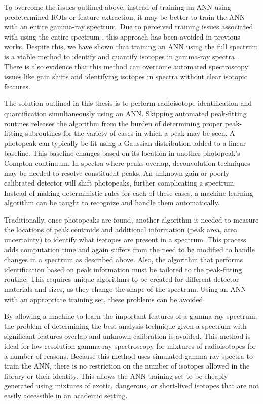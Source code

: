 To overcome the issues outlined above, instead of training an ANN using predetermined ROIs or feature extraction, it may be better to train the ANN with an entire gamma-ray spectrum. Due to perceived training issues associated with using the entire spectrum \cite{Pilato1999,Yoshida2002}, this approach has been avoided in previous works. Despite this, we have shown that training an ANN using the full spectrum is a viable method to identify and quantify isotopes in gamma-ray spectra \cite{kamuda2017,kamudaThesis2017}. There is also evidence that this method can overcome automated spectroscopy issues like gain shifts and identifying isotopes in spectra without clear isotopic features.

The solution outlined in this thesis is to perform radioisotope identification and quantification simultaneously using an ANN. Skipping automated peak-fitting routines releases the algorithm from the burden of determining proper peak-fitting subroutines for the variety of cases in which a peak may be seen. A photopeak can typically be fit using a Gaussian distribution added to a linear baseline. This baseline changes based on its location in another photopeak's Compton continuum. In spectra where peaks overlap, deconvolution techniques may be needed to resolve constituent peaks. An unknown gain or poorly calibrated detector will shift photopeaks, further complicating a spectrum. Instead of making deterministic rules for each of these cases, a machine learning algorithm can be taught to recognize and handle them automatically.

Traditionally, once photopeaks are found, another algorithm is needed to measure the locations of peak centroids and additional information (peak area, area uncertainty) to identify what isotopes are present in a spectrum. This process adds computation time and again suffers from the need to be modified to handle changes in a spectrum as described above. Also, the algorithm that performs identification based on peak information must be tailored to the peak-fitting routine. This requires unique algorithms to be created for different detector materials and sizes, as they change the shape of the spectrum. Using an ANN with an appropriate training set, these problems can be avoided.

By allowing a machine to learn the important features of a gamma-ray spectrum, the problem of determining the best analysis technique given a spectrum with significant features overlap and unknown calibration is avoided. This method is ideal for low-resolution gamma-ray spectroscopy for mixtures of radioisotopes for a number of reasons. Because this method uses simulated gamma-ray spectra to train the ANN, there is no restriction on the number of isotopes allowed in the library or their identity. This allows the ANN training set to be cheaply generated using mixtures of exotic, dangerous, or short-lived isotopes that are not easily accessible in an academic setting. 


